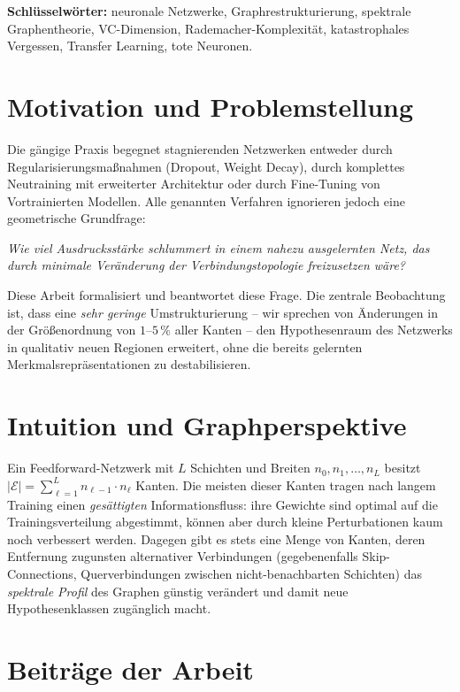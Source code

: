 ﻿\documentclass[12pt, a4paper, openany]{report}
\newcommand{\calE}{\mathcal{E}}
\begin{document}
\textbf{Schlüsselwörter:} neuronale Netzwerke, Graphrestrukturierung,
spektrale Graphentheorie, VC-Dimension, Rademacher-Komplexität,
katastrophales Vergessen, Transfer Learning, tote Neuronen.

\section{Motivation und Problemstellung}

Die gängige Praxis begegnet stagnierenden Netzwerken entweder durch
Regularisierungsmaßnahmen (Dropout, Weight Decay), durch komplettes
Neutraining mit erweiterter Architektur oder durch Fine-Tuning von
Vortrainierten Modellen.  Alle genannten Verfahren ignorieren jedoch eine
geometrische Grundfrage:

\begin{center}
\itshape
Wie viel Ausdrucksstärke schlummert in einem nahezu ausgelernten Netz,
das durch minimale Veränderung der Verbindungstopologie freizusetzen wäre?
\end{center}

Diese Arbeit formalisiert und beantwortet diese Frage.  Die zentrale
Beobachtung ist, dass eine \emph{sehr geringe} Umstrukturierung -- wir
sprechen von Änderungen in der Größenordnung von $1$--$5\,\%$ aller Kanten --
den Hypothesenraum des Netzwerks in qualitativ neuen Regionen erweitert, ohne
die bereits gelernten Merkmalsrepräsentationen zu destabilisieren.

\section{Intuition und Graphperspektive}

Ein Feedforward-Netzwerk mit $L$ Schichten und Breiten $n_0, n_1, \ldots, n_L$
besitzt $|\calE| = \sum_{\ell=1}^L n_{\ell-1}\cdot n_\ell$ Kanten.  Die
meisten dieser Kanten tragen nach langem Training einen
\emph{gesättigten} Informationsfluss: ihre Gewichte sind optimal auf die
Trainingsverteilung abgestimmt, können aber durch kleine Perturbationen kaum
noch verbessert werden.  Dagegen gibt es stets eine Menge von Kanten, deren
Entfernung zugunsten alternativer Verbindungen (gegebenenfalls Skip-Connections,
Querverbindungen zwischen nicht-benachbarten Schichten) das
\emph{spektrale Profil} des Graphen günstig verändert und damit neue
Hypothesenklassen zugänglich macht.

\section{Beiträge der Arbeit}
\end{document}

